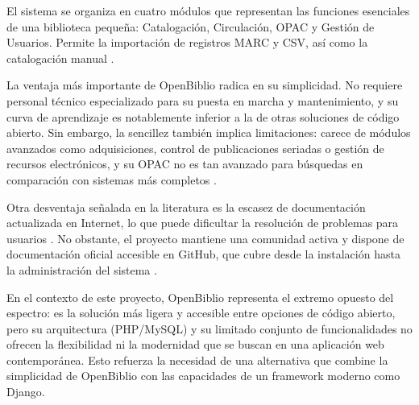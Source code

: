 El sistema se organiza en cuatro módulos que representan las funciones esenciales de una biblioteca pequeña: Catalogación, Circulación, OPAC y Gestión de Usuarios. Permite la importación de registros MARC y CSV, así como la catalogación manual \parencite{vimalkumar2005}.

La ventaja más importante de OpenBiblio radica en su simplicidad. No requiere personal técnico especializado para su puesta en marcha y mantenimiento, y su curva de aprendizaje es notablemente inferior a la de otras soluciones de código abierto. Sin embargo, la sencillez también implica limitaciones: carece de módulos avanzados como adquisiciones, control de publicaciones seriadas o gestión de recursos electrónicos, y su OPAC no es tan avanzado para búsquedas en comparación con sistemas más completos \parencite{vimalkumar2005}.

Otra desventaja señalada en la literatura es la escasez de documentación actualizada en Internet, lo que puede dificultar la resolución de problemas para usuarios \parencite{bwalya2017openbiblio}. No obstante, el proyecto mantiene una comunidad activa y dispone de documentación oficial accesible en GitHub, que cubre desde la instalación hasta la administración del sistema \parencite{openbiblio_docs}.

En el contexto de este proyecto, OpenBiblio representa el extremo opuesto del espectro: es la solución más ligera y accesible entre opciones de código abierto, pero su arquitectura (PHP/MySQL) y su limitado conjunto de funcionalidades no ofrecen la flexibilidad ni la modernidad que se buscan en una aplicación web contemporánea. Esto refuerza la necesidad de una alternativa que combine la simplicidad de OpenBiblio con las capacidades de un framework moderno como Django.

